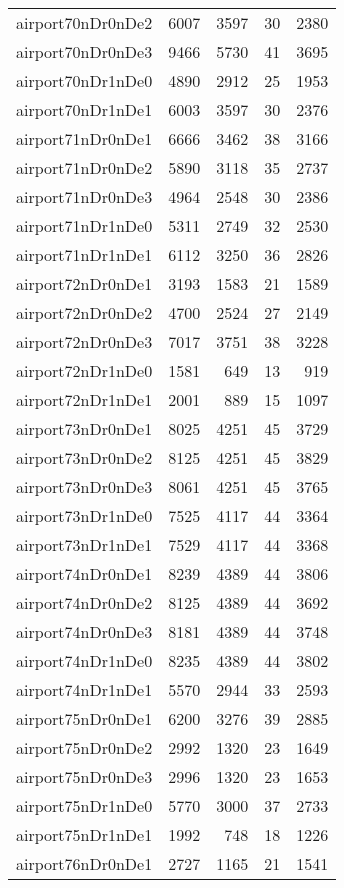 \begin{longtable}{lrrrr}
airport70nDr0nDe2 & 6007 & 3597 & 30 & 2380 \\
airport70nDr0nDe3 & 9466 & 5730 & 41 & 3695 \\
airport70nDr1nDe0 & 4890 & 2912 & 25 & 1953 \\
airport70nDr1nDe1 & 6003 & 3597 & 30 & 2376 \\
airport71nDr0nDe1 & 6666 & 3462 & 38 & 3166 \\
airport71nDr0nDe2 & 5890 & 3118 & 35 & 2737 \\
airport71nDr0nDe3 & 4964 & 2548 & 30 & 2386 \\
airport71nDr1nDe0 & 5311 & 2749 & 32 & 2530 \\
airport71nDr1nDe1 & 6112 & 3250 & 36 & 2826 \\
airport72nDr0nDe1 & 3193 & 1583 & 21 & 1589 \\
airport72nDr0nDe2 & 4700 & 2524 & 27 & 2149 \\
airport72nDr0nDe3 & 7017 & 3751 & 38 & 3228 \\
airport72nDr1nDe0 & 1581 & 649 & 13 & 919 \\
airport72nDr1nDe1 & 2001 & 889 & 15 & 1097 \\
airport73nDr0nDe1 & 8025 & 4251 & 45 & 3729 \\
airport73nDr0nDe2 & 8125 & 4251 & 45 & 3829 \\
airport73nDr0nDe3 & 8061 & 4251 & 45 & 3765 \\
airport73nDr1nDe0 & 7525 & 4117 & 44 & 3364 \\
airport73nDr1nDe1 & 7529 & 4117 & 44 & 3368 \\
airport74nDr0nDe1 & 8239 & 4389 & 44 & 3806 \\
airport74nDr0nDe2 & 8125 & 4389 & 44 & 3692 \\
airport74nDr0nDe3 & 8181 & 4389 & 44 & 3748 \\
airport74nDr1nDe0 & 8235 & 4389 & 44 & 3802 \\
airport74nDr1nDe1 & 5570 & 2944 & 33 & 2593 \\
airport75nDr0nDe1 & 6200 & 3276 & 39 & 2885 \\
airport75nDr0nDe2 & 2992 & 1320 & 23 & 1649 \\
airport75nDr0nDe3 & 2996 & 1320 & 23 & 1653 \\
airport75nDr1nDe0 & 5770 & 3000 & 37 & 2733 \\
airport75nDr1nDe1 & 1992 & 748 & 18 & 1226 \\
airport76nDr0nDe1 & 2727 & 1165 & 21 & 1541 \\

\end{longtable}

